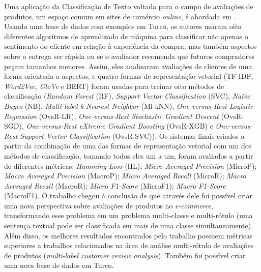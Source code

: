Uma aplicação da Classificação de Texto voltada para o campo de avaliações de produtos, um espaço comum em sites de comércio \textit{online}, é abordada em \cite{relacionado_tur}. Usando uma base de dados com exemplos em Turco, os autores usaram oito diferentes algoritmos de aprendizado de máquina para classificar não apenas o sentimento do cliente em relação à experiência da compra, mas também aspectos sobre a entrega ser rápida ou se o avaliador recomenda que futuros compradores peçam tamanhos menores. Assim, eles analisaram avaliações de clientes de uma forma orientada a aspectos, e quatro formas de representação vetorial (TF-IDF, \textit{Word2Vec}, \textit{GloVe} \cite{glove} e BERT) foram usadas para treinar oito métodos de classificação (\textit{Random Forest} (RF), \textit{Support Vector Classification} (SVC), \textit{Naive Bayes} (NB), \textit{Multi-label k-Nearest Neighbor} (Ml-kNN), \textit{One-versus-Rest Logistic Regression} (OvsR-LR), \textit{One-versus-Rest Stochastic Gradient Descent} (OvsR-SGD), \textit{One-versus-Rest eXtreme Gradient Boosting} (OvsR-XGB) e \textit{One-versus-Rest Support Vector Classification} (OvsR-SVC)). Os sistemas finais criados a partir da combinação de uma das formas de representação vetorial com um dos métodos de classificação, tomando todos eles um a um, foram avaliados a partir de diferentes métricas: \textit{Hamming Loss} (HL); \textit{Micro Averaged Precision} (MicroP); \textit{Macro Averaged Precision} (MacroP); \textit{Micro Averaged Recall} (MicroR); \textit{Macro Averaged Recall} (MacroR); \textit{Micro F1-Score} (MicroF1); \textit{Macro F1-Score} (MacroF1). O trabalho chegou à conclusão de que através dele foi possível criar uma nova perspectiva sobre avaliações de produtos no \textit{e-commerce}, transformando esse problema em um problema multi-classe e multi-rótulo (uma sentença textual pode ser classificada em mais de uma classe simultaneamente). Além disso, os melhores resultados encontrados pelo trabalho possuem métricas superiores a trabalhos relacionados na área de análise multi-rótulo de avaliações de produtos (\textit{multi-label customer
review analysis}). Também foi possível criar uma nova base de dados em Turco.

